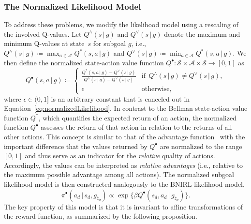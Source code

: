 \documentclass[twoside,11pt]{article}
\newcommand{\given}{\,\vert\,}
\newcommand{\softmax}{{\pi}}
\newcommand{\defeq}{\coloneqq}
\newcommand{\eqkomma}{,}
\newcommand{\eqpunkt}{.}
\newcommand{\ie}{i.e.}
\begin{document}
\subsubsection{The Normalized Likelihood Model}
\label{sec:normalizedLikelihood}
To address these problems, we modify the likelihood model using a rescaling of the involved Q-values. Let ${Q}^\wedge(s \given g)$ and ${Q}^\vee(s \given g)$ denote the maximum and minimum Q-values at state~$s$ for subgoal $g$, \ie, ${Q}^\wedge(s \given g) \defeq \max_{a\in\mathcal{A}} Q^*(s,a \given g)$ and ${Q}^\vee(s \given g) \defeq \min_{a\in\mathcal{A}}Q^*(s,a \given g)$. We then define the normalized state-action value function $Q^\bullet:\mathcal{S}\times\mathcal{A}\times\mathcal{S}\rightarrow[0,1]$ as
\begin{equation}
Q^\bullet(s, a \given  g) \defeq
\begin{cases}
\frac{Q^*(s,a \given g) - {Q}^\vee(s \given g)}{{Q}^\wedge(s \given g) - {Q}^\vee(s \given g)} & \text{if} \ \ {Q}^\wedge(s \given g) \neq {Q}^\vee(s \given g) \eqkomma \\
\epsilon & \text{otherwise} \eqkomma
\end{cases}
\label{eq:normalizedQ}
\end{equation}
where $\epsilon\in(0,1]$ is an arbitrary constant that is canceled out in Equation~\eqref{eq:normalizedLikelihood}.
In contrast to the Bellman state-action value function $Q^*$, %
which %
quantifies the expected return of an action, the normalized function $Q^\bullet$ assesses the return of that action in relation to the returns of all other actions. This concept is similar to that of the advantage function~\citep{baird1994reinforcement} with the important difference that the values returned by $Q^\bullet$ are normalized to the range $[0,1]$ and thus serve as an indicator for the \textit{relative} %
quality of actions. Accordingly, the values can be interpreted as \textit{relative advantages} (\ie, relative to the maximum possible advantage among all actions).
The normalized subgoal likelihood model is then constructed analogously to the BNIRL likelihood model,
\begin{equation}
\softmax^\bullet(a_d \given s_d, g_{\tilde{z}_d}) \propto \exp\big\{\beta Q^\bullet(s_d, a_d \given g_{\tilde{z}_d})\big\} \eqpunkt %
\label{eq:normalizedLikelihood}
\end{equation}
The key property of %
this model is that it is invariant to affine transformations of the reward function, as summarized by the following proposition.
\end{document}
